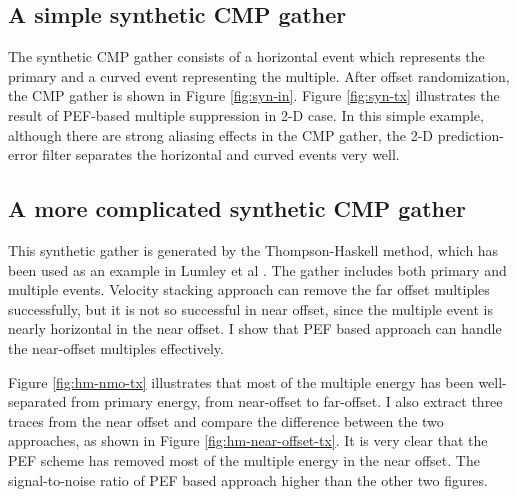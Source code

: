 \subsection{A simple synthetic CMP gather}

The synthetic CMP gather consists of a horizontal event which represents 
the primary and a curved event representing the multiple. After offset 
randomization, the CMP gather is shown in Figure \ref{fig:syn-in}. Figure 
\ref{fig:syn-tx} illustrates the result of PEF-based multiple suppression in 
2-D case. In this simple example, although there are strong aliasing effects 
in the CMP gather, the 2-D prediction-error filter separates the horizontal 
and curved events very well.


\subsection{A more complicated synthetic CMP gather}

This synthetic gather is generated by the Thompson-Haskell method, which 
has been used as an example in Lumley et al .
The gather includes both primary and multiple events. Velocity stacking 
approach can remove the far offset multiples successfully, but it is not 
so successful in near offset, since the multiple event is nearly horizontal 
in the near offset. I show that PEF based approach can handle the near-offset 
multiples effectively.

Figure \ref{fig:hm-nmo-tx} illustrates that most of the 
multiple energy has been well-separated from primary energy, from near-offset 
to far-offset. I also extract three traces from the near offset and compare 
the difference between the two approaches, as shown in Figure 
\ref{fig:hm-near-offset-tx}. 
It is very clear that the PEF scheme has removed most of the multiple energy 
in the near offset. The signal-to-noise ratio of PEF based approach higher 
than the other two figures.


